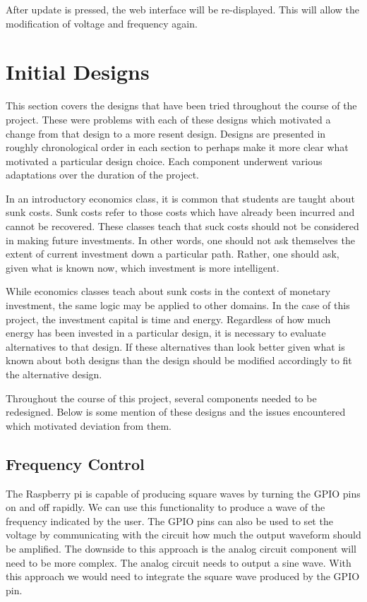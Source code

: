 \documentclass{article}	%
\begin{document}
\begin{multicols}{2}
After update is pressed,
the web interface will be re-displayed.
This will allow the modification of voltage and frequency again.

\newpage
\section{Initial Designs}
This section covers the designs that have been tried
throughout the course of the project. 
These were problems with each of these designs
which motivated a change from that design to
a more resent design.
Designs are presented in roughly chronological order in each section
to perhaps make it more clear what motivated
a particular design choice.
Each component underwent various adaptations 
over the duration of the project.

In an introductory economics class,
it is common that students are taught about sunk costs.
Sunk costs refer to those costs which
have already been incurred and
cannot be recovered.
These classes teach that suck costs should not
be considered in making future investments.
In other words,
one should not ask themselves the extent of 
current investment down a particular path.
Rather, one should ask,
given what is known now,
which investment is more intelligent.

While economics classes teach about sunk costs in
the context of monetary investment,
the same logic may be applied to other domains.
In the case of this project,
the investment capital is time and energy.
Regardless of how much energy has been invested
in a particular design,
it is necessary to evaluate alternatives to that design.
If these alternatives than look better
given what is known about both designs
than the design should be modified accordingly
to fit the alternative design.

Throughout the course of this project,
several components needed to be redesigned.
Below is some mention of these designs and
the issues encountered which motivated deviation from them.

\subsection{Frequency Control}
The Raspberry pi is capable of producing square waves by turning the GPIO pins on and off rapidly. We can use this functionality to produce a wave of the frequency indicated by the user. The GPIO pins can also be used to set the voltage by communicating with the circuit how much the output waveform should be amplified. The downside to this approach is the analog circuit component will need to be more complex. The analog circuit needs to output a sine wave. With this approach we would need to integrate the square wave produced by the GPIO pin.


\end{multicols}
\end{document}
